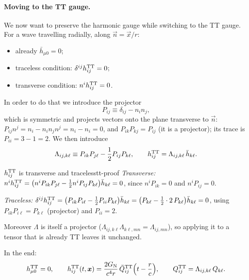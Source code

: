 \paragraph{Moving to the TT gauge.} We now want to preserve the harmonic gauge while switching to the TT gauge. For a wave travelling radially, along $\vec n=\vec x/r$:
\begin{itemize}[nosep]
\item already $\bar h_{\mu0}=0$;
\item traceless condition: $\delta^{ij}h^{\rm TT}_{ij}=0$;
\item transverse condition: $n^ih^{\rm TT}_{ij}=0$.
\end{itemize}
In order to do that we introduce the projector
\begin{equation}
  P_{ij}\equiv\delta_{ij}-n_in_j ,
\end{equation}
which is symmetric and projects vectors onto the plane transverse to $\vec n$: $P_{ij}n^j=n_i-n_in_jn^j=n_i-n_i=0$, and $P_{ik}P_{kj}=P_{ij}$ (it is a projector); its trace is $P_{ii}=3-1=2$. We then introduce
\begin{equation}
  \Lambda_{ij,k\ell}\equiv P_{ik}P_{j\ell}-\frac12P_{ij}P_{k\ell},\qquad h^{\rm TT}_{ij}=\Lambda_{ij,k\ell}\,\bar h_{k\ell}.
\end{equation}
\begin{exercise}{$h^{\rm TT}_{ij}$ is transverse and traceless}{tt-proof}
\textit{Transverse:} $n^ih^{\rm TT}_{ij}=\big(n^iP_{ik}P_{j\ell}-\frac12n^iP_{ij}P_{k\ell}\big)\bar h_{k\ell}=0$, since $n^iP_{ik}=0$ and $n^iP_{ij}=0$.

\textit{Traceless:} $\delta^{ij}h^{\rm TT}_{ij}=\big(P_{ik}P_{i\ell}-\frac12P_{ii}P_{k\ell}\big)\bar h_{k\ell}=\big(P_{k\ell}-\frac12\cdot2\,P_{k\ell}\big)\bar h_{k\ell}=0$, using $P_{ik}P_{i\ell}=P_{k\ell}$ (projector) and $P_{ii}=2$.

Moreover $\Lambda$ is itself a projector ($\Lambda_{ij,k\ell}\Lambda_{k\ell,mn}=\Lambda_{ij,mn}$), so applying it to a tensor that is already TT leaves it unchanged.
\end{exercise}

\begin{keyresult}
In the end:
\begin{equation}
  h^{\rm TT}_{\mu0}=0,\qquad h^{\rm TT}_{ij}(t,\bm{x})=\frac{2G_{\mathrm N}}{c^4r}\,\ddot Q^{\rm TT}_{ij}\Big(t-\frac rc\Big),\qquad Q^{\rm TT}_{ij}=\Lambda_{ij,k\ell}\,Q_{k\ell}.
\end{equation}
\end{keyresult}

